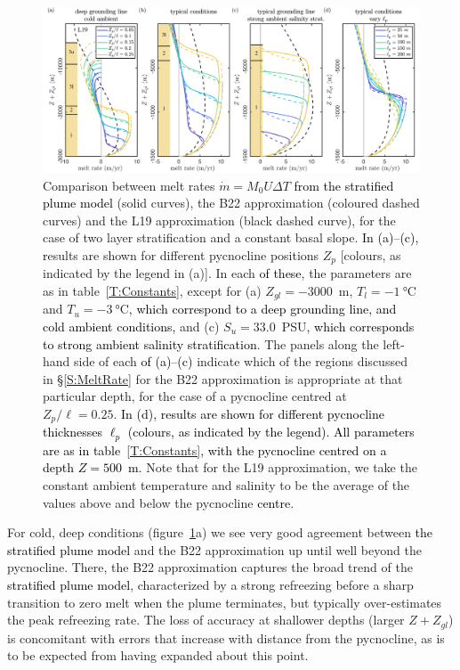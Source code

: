 \documentclass[openacc]{rsproca_new}%
\newcommand{\red}[1]{{\color{red} #1}}
\newcommand{\blue}[1]{{\color{blue} #1}}
\newcommand{\rout}[1]{\red{\st{#1}}}\newcommand{\ab}[1]{\textcolor{Green}{#1}}\newcommand{\about}[1]{\textcolor{Cyan}{\sout{#1}}}
\renewcommand{\rout}[1]{{}} %
\renewcommand{\blue}[1]{{\textcolor{black}{#1}}} %
\renewcommand{\red}[1]{{}} %
\begin{document}
\begin{figure}
\centering
\includegraphics[width = \textwidth]{./make_plots/plots/figure6.pdf}
\caption{Comparison between \rout{numerically obtained }melt rates $\dot{m}= M_0 U \Delta T$ \blue{from the stratified plume model} (solid curves), the B22 approximation (coloured dashed curves) and the L19 approximation (black dashed curve), for the case of two layer stratification and a constant basal slope. \blue{In (a)--(c),} \rout{R}\blue{r}esults are shown for different pycnocline positions $Z_p$ [colours, as indicated by the legend in (a)]. In each \rout{case}\blue{of these}, the parameters are as in table~\ref{T:Constants}, except for (a) $Z_{gl} = -3000$~m, $T_l = -1~\si{\celsius}$ and $T_u = -3~\si{\celsius}$\blue{, which correspond to a deep grounding line, and cold ambient conditions,} and (c)  $S_u = 33.0$~PSU\blue{, which corresponds to strong ambient salinity stratification}.  The panels along the left-hand side of each \rout{subplot}\blue{of (a)--(c)} indicate which of the regions discussed in \S\ref{S:MeltRate} for the B22 approximation is appropriate at that particular depth, for the case of a pycnocline centred at $Z_p/\ell = 0.25$. \blue{In (d), results are shown for different pycnocline thicknesses $\ell_p$ (colours, as indicated by the legend). All parameters are as in table~\ref{T:Constants}, with the pycnocline centred on a depth $Z = 500$~m.} Note that for the L19 approximation, we take the constant ambient temperature and salinity to be the average of the values above and below the pycnocline \blue{centre}.}\label{fig:Numerics:PycnoclinePosition}
\end{figure}

For cold, deep conditions (figure~\ref{fig:Numerics:PycnoclinePosition}a) we see very good agreement between \blue{the stratified plume model}\rout{numerically obtained melt rates} and the B22 approximation up until well beyond the pycnocline. There, the B22 approximation captures the broad trend of the \blue{stratified plume model}\rout{numerical solutions}, characterized by a strong refreezing before a sharp transition to zero melt when the plume terminates, but typically over-estimates the peak refreezing rate. The loss of accuracy at shallower depths (larger $Z + Z_{gl}$) is concomitant with errors that increase with distance from the pycnocline, as is to be expected from having expanded about this point.
\end{document}
